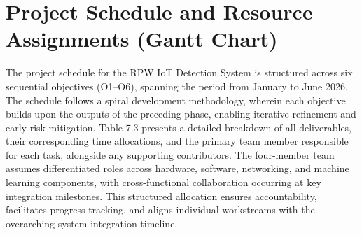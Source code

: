 \documentclass[12pt,a4paper,oneside]{memoir}
\begin{document}
\section{Project Schedule and Resource Assignments (Gantt Chart)}
\label{sec:Schedule}

The project schedule for the RPW IoT Detection System is structured across six sequential objectives (O1--O6), spanning the period from January to June 2026. The schedule follows a spiral development methodology, wherein each objective builds upon the outputs of the preceding phase, enabling iterative refinement and early risk mitigation. Table 7.3 presents a detailed breakdown of all deliverables, their corresponding time allocations, and the primary team member responsible for each task, alongside any supporting contributors. The four-member team assumes differentiated roles across hardware, software, networking, and machine learning components, with cross-functional collaboration occurring at key integration milestones. This structured allocation ensures accountability, facilitates progress tracking, and aligns individual workstreams with the overarching system integration timeline.
\end{document}
